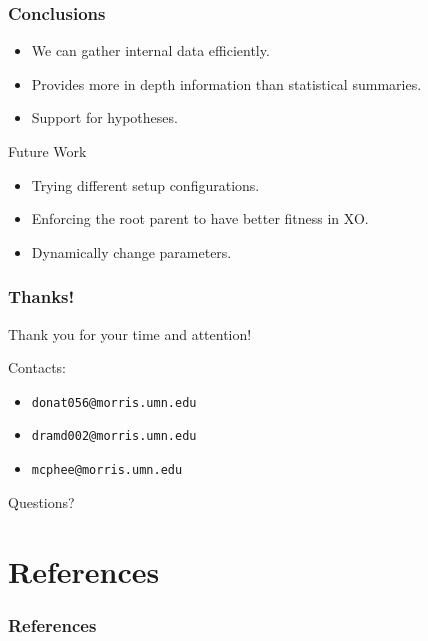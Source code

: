 \documentclass{beamer}
\newcommand{\linespace}{\vskip 0.25cm}
\begin{document}
\begin{frame}
\frametitle{Conclusions}

\begin{itemize}
\item We can gather internal data efficiently.
\item Provides more in depth information than statistical summaries. 
\item Support for hypotheses.
\end{itemize}
\linespace
\linespace
\linespace
\linespace

Future Work
\begin{itemize}
\item Trying different setup configurations.
\item Enforcing the root parent to have better fitness in XO.
\item Dynamically change parameters.
\end{itemize}
\end{frame}

\begin{frame}
	\frametitle{Thanks!}
	
	Thank you for your time and attention!
		
	\linespace
	\linespace
	
	Contacts:  
	\begin{itemize}
		\item \texttt{donat056@morris.umn.edu}
		\item \texttt{dramd002@morris.umn.edu}
		\item \texttt{mcphee@morris.umn.edu}
	\end{itemize}
	
	\linespace
	\linespace
	
	\begin{center}
	{\huge Questions?}
	\end{center}
\end{frame}

\section*{References}

\begin{frame} 
\frametitle{References}

{\tiny }
\end{frame} 
\end{document}
